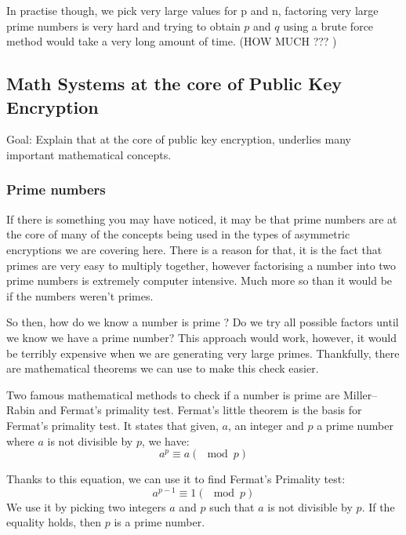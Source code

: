 \documentclass[conference]{IEEEtran}
\begin{document}
In practise though, we pick very large values for p and n, factoring very large prime
numbers is very hard and trying to obtain $p$ and $q$ using a brute force method
would take a very long amount of time.
(HOW MUCH ??? )


\subsection{Math Systems at the core of Public Key Encryption}
Goal: Explain that at the core of public key encryption, underlies
many important mathematical concepts.

\subsubsection{Prime numbers}
If there is something you may have noticed, it may be that prime numbers
are at the core of many of the concepts being used in the types of 
asymmetric encryptions we are covering here. There is a reason
for that, it is the fact that primes are very easy to multiply together,
however factorising a number into two prime numbers is extremely computer intensive.
Much more so than it would be if the numbers weren't primes. 

So then, how do we know a number is prime ? Do we try all possible factors
until we know we have a prime number? This approach would work, however, it 
would be terribly expensive when we are generating very large primes.
Thankfully, there are mathematical theorems we can use to make this check easier.

Two famous mathematical methods to check if a number is prime 
are Miller–Rabin and Fermat's primality test. 
Fermat's little theorem is the basis for Fermat's primality test. It states that
given, $a$, an integer and $p$ a prime number where $a$ is not divisible by $p$, we have:
\begin{equation*}
    a^{p} \equiv a (\mod p)
\end{equation*}

Thanks to this equation, we can use it to find Fermat's Primality test: 
\begin{equation*}
    a^{p - 1} \equiv 1 (\mod p)
\end{equation*}
We use it by picking two integers $a$ and $p$ such that $a$ is not divisible by $p$.
If the equality holds, then $p$ is a prime number.
\end{document}
